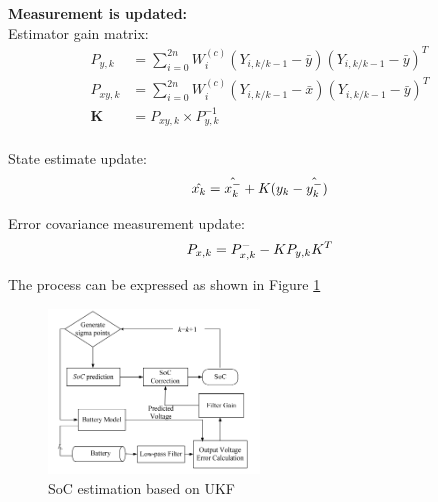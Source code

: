 \textbf{Measurement is updated:} \\
Estimator gain matrix: \\
\begin{equation} \label{eq:UKF_Estimator gain matrix}
    \begin{split}
        P_{y,k} & =  \sum_{i = 0}^{2n} W_i^{(c)} (Y_{i,k/k-1}  - \bar{y})(Y_{i,k/k-1}   - \bar{y})^{T}  \\
        P_{xy,k} & =  \sum_{i = 0}^{2n} W_i^{(c)} (Y_{i,k/k-1}  - \bar{x})(Y_{i,k/k-1}   - \bar{y})^{T} \\
        \textbf{K} &= P_{xy,k} \times P_{y,k}^{-1}  \\
    \end{split}
\end{equation}  

State estimate update: \\
\begin{equation} \label{eq:UKF_State_estimate_update}
     \hat{x_k} = \hat{x_k^{-}} + K (y_k - \hat{y_k^{-}} )  \\
\end{equation}  

Error covariance measurement update:\\
\begin{equation} \label{eq:UKF_Error_covariance_measurement_update}
    P_{x,k} = P_{x,k}^{-}  -  K P_{y,k} K^{T} \\
\end{equation}  

The process can be expressed as shown in Figure \ref{fig:SoC_estimation_based_on_UKF}
\begin{figure}[h]
    \centering
    \includegraphics[width=0.5\textwidth]{Chap07/Figures/SoC_estimation_based_on_UKF.PNG}
    \caption{SoC estimation based on UKF }
    \label{fig:SoC_estimation_based_on_UKF}
\end{figure}

